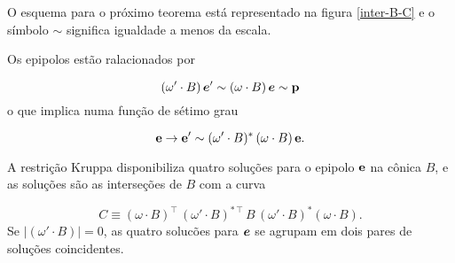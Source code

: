 O esquema para o próximo teorema está representado na figura \ref{inter-B-C} e o símbolo $\sim$ significa igualdade a menos da escala.

\begin{teorema}
Os epipolos estão ralacionados por 

\begin{equation}\label{eq.equiv-reta-polar-sem-B}
(\omega'\cdot B)\,\boldsymbol{e}'\sim (\omega\cdot B)\,\boldsymbol{e}\sim{\bf p}
\end{equation}
o que implica numa função de sétimo grau 

\begin{equation}\label{eq.map-7-grau}
{\bf e} \rightarrow {\bf e'} \sim (\omega' \cdot B)^*\,(\omega \cdot B)\,{\bf e}.
\end{equation}

A restrição Kruppa disponibiliza quatro soluções para o epipolo ${\bf e}$ na cônica $B$, e as soluções são as interseções  de $B$ com a curva 

\begin{equation}\label{eq.definicao-conica-C}
C \equiv (\omega \cdot B)^\top\,(\omega' \cdot B)^{*\,\top}\,B\,(\omega' \cdot B)^*(\omega \cdot B).
\end{equation}
Se $|(\omega'\cdot B)|=0$, as quatro solucões para $\boldsymbol{e}$ se agrupam em dois pares de soluções coincidentes.
\end{teorema}

